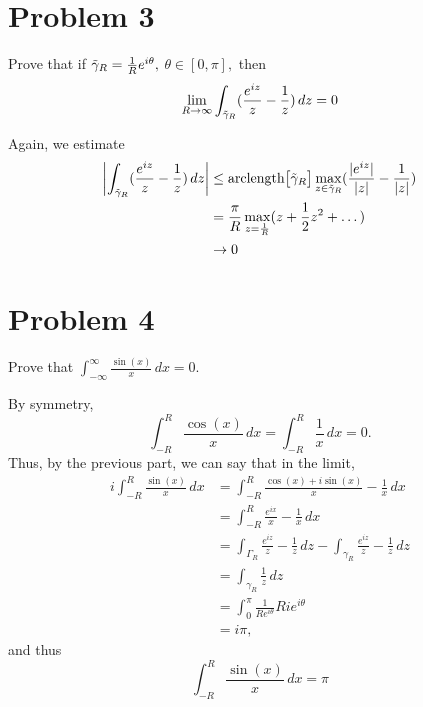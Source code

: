 \documentclass[11pt]{article}
\begin{document}
\section*{Problem 3}
\begin{problem}
    Prove that if $\Tilde{\gamma}_R = \frac{1}{R}e^{i\theta},$ $\theta \in [0, \pi],$ then 
    \[\lim_{R\to \infty} \int_{\Tilde{\gamma}_R}(\frac{e^{iz}}{z} - \frac{1}{z}) \, dz = 0 \]
\end{problem}
\begin{solution}
    Again, we estimate
    \begin{align*}
      \left|\int_{\Tilde{\gamma}_R}(\frac{e^{iz}}{z} - \frac{1}{z}) \, dz\right|  &\leq \text{arclength}\big[\Tilde{\gamma}_R\big]\max_{z \in \Tilde{\gamma}_R}(\frac{|e^{iz}|}{|z|} - \frac{1}{|z|})\\
      &= \frac{\pi}{R} \max_{z = \frac{1}{R}}(z + \frac{1}{2}z^2 + \dots)\\
      &\to 0
    \end{align*}
\end{solution}

\newpage
\section*{Problem 4}
\begin{problem}
    Prove that $\int_{-\infty}^\infty \frac{\sin(x)}{x}\, dx = 0.$
\end{problem}
\begin{solution}
By symmetry, 
\[\int_{-R}^R \frac{\cos(x)}{x}\,dx =  \int_{-R}^R \frac{1}{x}\, dx = 0.\] Thus, by the previous part, we can say that in the limit,
\begin{align*}
    i\int_{-R}^R \frac{\sin(x)}{x}\, dx &= \int_{-R}^R \frac{\cos(x) + i\sin(x)}{x}- \frac{1}{x}\, dx\\
    &= \int_{-R}^R \frac{e^{ix}}{x} - \frac{1}{x}\, dx\\
    &= \int_{\Gamma_R}\frac{e^{iz}}{z} - \frac{1}{z}\, dz - \int_{\gamma_R}\frac{e^{iz}}{z} - \frac{1}{z}\, dz\\
    &= \int_{\gamma_R} \frac{1}{z}\,dz\\
    &= \int_0^\pi \frac{1}{Re^{i\theta}}Rie^{i\theta}\\
    &= i\pi,
\end{align*}
and thus 
\[\int_{-R}^R \frac{\sin(x)}{x}\, dx = \pi\]
    
\end{solution}

\newpage
\end{document}
